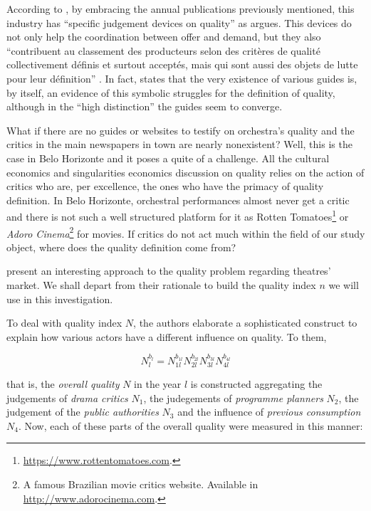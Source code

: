 \documentclass[a4paper, 12pt, openright, oneside, german, french, brazil, english]{abntex2}
\begin{document}
        According to , by embracing the annual publications previously mentioned, this industry has ``specific judgement devices on quality'' as   argues. This devices do not only help the coordination between offer and demand, but they also ``contribuent au classement des producteurs selon des critères de qualité collectivement définis et surtout acceptés, mais qui sont aussi des objets de lutte pour leur définition'' \cite[p. 494]{eloire2009reseaux}. In fact,  states that the very existence of various guides is, by itself, an evidence of this symbolic struggles for the definition of quality, although in the ``high distinction'' the guides seem to converge.

        What if there are no guides or websites to testify on orchestra's quality and the critics in the main newspapers in town are nearly nonexistent? Well, this is the case in Belo Horizonte and it poses a quite of a challenge. All the cultural economics and singularities economics discussion on quality relies on the action of critics who are, per excellence, the ones who have the primacy of quality definition. In Belo Horizonte, orchestral performances almost never get a critic and there is not such a well structured platform for it as Rotten Tomatoes\footnote{\url{https://www.rottentomatoes.com}.} or \textit{Adoro Cinema}\footnote{A famous Brazilian movie critics website. Available in \url{http://www.adorocinema.com}.} for movies. If critics do not act much within the field of our study object, where does the quality definition come from?
        
	 present an interesting approach to the quality problem regarding theatres' market. We shall depart from their rationale to build the quality index $n$ we will use in this investigation.

        To deal with quality index $N$, the authors elaborate a sophisticated construct to explain how various actors have a different influence on quality. To them,
	
	\begin{equation}
	\label{biencourt-quality}
		N_{l}^{b_l} = N_{1l}^{b_{1l}} N_{2l}^{b_{2l}} N_{3l}^{b_{3l}} N_{4l}^{b_{4l}} 
	\end{equation}
	
	that is, the \textit{overall quality} $N$ in the year $l$ is constructed aggregating the judgements of \textit{drama critics} $N_1$, the judegements of \textit{programme planners} $N_2$, the judgement of the \textit{public authorities} $N_3$ and the influence of \textit{previous consumption} $N_4$. Now, each of these parts of the overall quality were measured in this manner:
	
\end{document}
